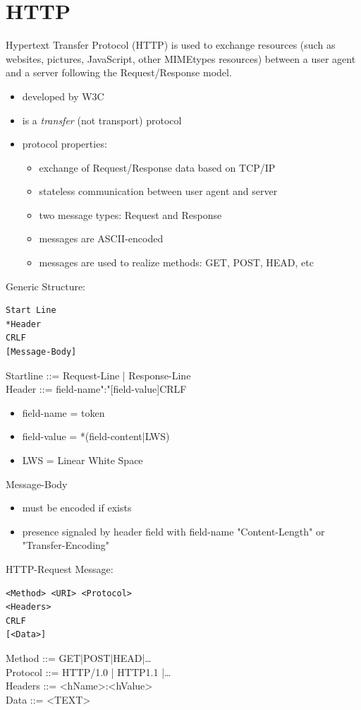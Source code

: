 \documentclass[11pt]{article}
\begin{document}
\section{HTTP}
\label{sec:org0a05f8a}
Hypertext Transfer Protocol (HTTP) is used to exchange resources (such as websites, pictures, JavaScript, other MIMEtypes resources) between a user agent and a server following the Request/Response model.
\begin{itemize}
\item developed by W3C
\item is a \emph{transfer} (not transport) protocol
\item protocol properties:
\begin{itemize}
\item exchange of Request/Response data based on TCP/IP
\item stateless communication between user agent and server
\item two message types: Request and Response
\item messages are ASCII-encoded
\item messages are used to realize methods: GET, POST, HEAD, etc
\end{itemize}
\end{itemize}

Generic Structure:
\begin{verbatim}
Start Line
*Header
CRLF
[Message-Body]
\end{verbatim}
Startline ::= Request-Line | Response-Line\\
Header ::= field-name":"[field-value]CRLF
\begin{itemize}
\item field-name = token
\item field-value = *(field-content|LWS)
\item LWS = Linear White Space
\end{itemize}
Message-Body
\begin{itemize}
\item must be encoded if exists
\item presence signaled by header field with field-name "Content-Length" or "Transfer-Encoding"
\end{itemize}

HTTP-Request Message:
\begin{verbatim}
<Method> <URI> <Protocol>
<Headers>
CRLF
[<Data>]
\end{verbatim}
Method ::= GET|POST|HEAD|\ldots{}\\
Protocol ::= HTTP/1.0 | HTTP1.1 |\ldots{}\\
Headers ::= <hName>:<hValue>\\
Data ::= <TEXT>
\end{document}
